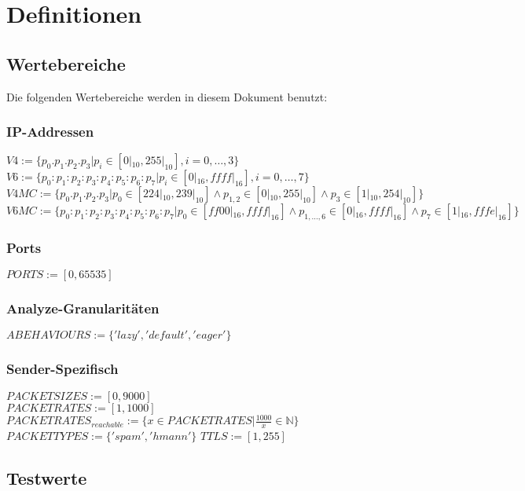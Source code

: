 \chapter{Definitionen}
\section{Wertebereiche}
Die folgenden Wertebereiche werden in diesem Dokument benutzt:\\

\subsection{IP-Addressen}
$ V4 := \{ p_0.p_1.p_2.p_3 | p_i \in [0|_{10},255|_{10}] , i=0,\ldots,3 \} $\\
$ V6 := \{ p_0:p_1:p_2:p_3:p_4:p_5:p_6:p_7 | p_i \in [0|_{16},ffff|_{16}] ,
i=0,\ldots,7 \} $\\
$ V4MC := \{ p_0.p_1.p_2.p_3 | p_0 \in [224|_{10},239|_{10}] \wedge p_{1,2} \in
[0|_{10},255|_{10}] \wedge p_3 \in [1|_{10},254|_{10}] \} $
$ V6MC := \{ p_0:p_1:p_2:p_3:p_4:p_5:p_6:p_7 | p_0 \in [ff00|_{16},ffff|_{16}]
\wedge p_{1,\ldots,6} \in [0|_{16},ffff|_{16}] \wedge p_7 \in
[1|_{16},fffe|_{16}] \} $\\

\subsection{Ports}
$ PORTS := [0,65535] $

\subsection{Analyze-Granularitäten}
$ABEHAVIOURS := \{ 'lazy', 'default', 'eager' \} $

\subsection{Sender-Spezifisch}
$PACKETSIZES := [0,9000]$\\
$PACKETRATES := [1,1000]$\\
$PACKETRATES_{reachable} := \{ x \in PACKETRATES | \frac{1000}{x} \in \mathbb{N}
\} $\\
$PACKETTYPES := \{ 'spam', 'hmann' \}$
$TTLS := [1,255]$

\section{Testwerte}
